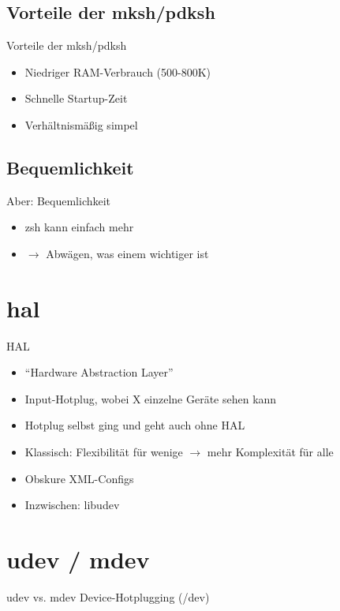 \documentclass{beamer}
\begin{document}
\subsection{Vorteile der mksh/pdksh}
\begin{frame}{Vorteile der mksh/pdksh}
	\begin{itemize}
		\item Niedriger RAM-Verbrauch (500-800K)
		\item Schnelle Startup-Zeit %
		\item Verhältnismäßig simpel
	\end{itemize}
\end{frame}

\subsection{Bequemlichkeit}
\begin{frame}{Aber: Bequemlichkeit}
	\begin{itemize}
		\item zsh kann einfach mehr
		\item $\rightarrow$ Abwägen, was einem wichtiger ist
	\end{itemize}
\end{frame}

\section{hal}
\begin{frame}{HAL}
	\begin{itemize}
		\item ``Hardware Abstraction Layer''
		\item Input-Hotplug, wobei X einzelne Geräte sehen kann
		\item Hotplug selbst ging und geht auch ohne HAL
		\item Klassisch: Flexibilität für wenige $\rightarrow$ mehr
			Komplexität für alle
		\item Obskure XML-Configs
		\item Inzwischen: libudev
	\end{itemize}
\end{frame}

\section{udev / mdev}
\begin{frame}{udev vs. mdev}
	Device-Hotplugging (/dev)
\end{frame}
\end{document}
